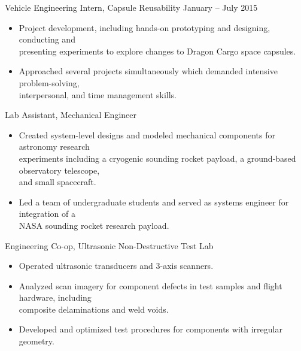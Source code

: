 \documentclass[10pt,final,sans]{resume}
\begin{document}
Vehicle Engineering Intern, Capsule Reusability \hfill January -- July 2015
\begin{itemize}
  \item Project development, including hands-on prototyping and designing, conducting and \\
  presenting experiments to explore changes to Dragon Cargo space capsules.
  \item Approached several projects simultaneously which demanded intensive problem-solving, \\
  interpersonal, and time management skills.
\end{itemize}

Lab Assistant, Mechanical Engineer
\begin{itemize}
  \item Created system-level designs and modeled mechanical components for astronomy research \\ 
  experiments including a cryogenic sounding rocket payload, a ground-based observatory telescope, \\
  and small spacecraft.
  \item Led a team of undergraduate students and served as systems engineer for integration of a \\
  NASA sounding rocket research payload.
\end{itemize}
Engineering Co-op, Ultrasonic Non-Destructive Test Lab
\begin{itemize}
  \item Operated ultrasonic transducers and 3-axis scanners.
  \item Analyzed scan imagery for component defects in test samples and flight hardware, including \\
  composite delaminations and weld voids.
  \item Developed and optimized test procedures for components with irregular geometry.
\end{itemize}

\end{document}
